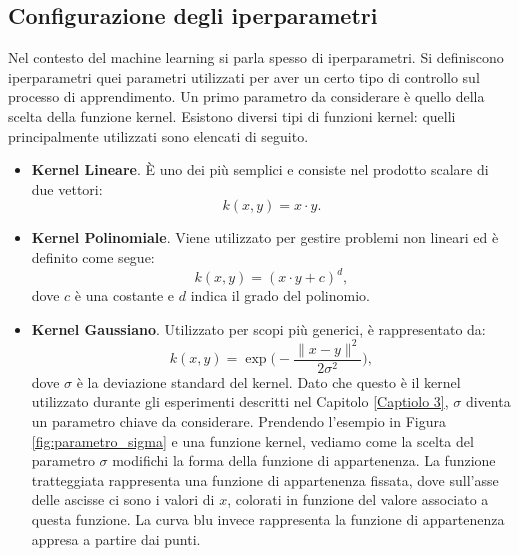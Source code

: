 \documentclass[a4paper,12pt]{report}
\begin{document}
\subsection*{Configurazione degli iperparametri}
Nel contesto del machine learning si parla spesso di iperparametri. Si definiscono iperparametri quei parametri utilizzati per aver un certo tipo di controllo sul processo di apprendimento. 
Un primo parametro da considerare è quello della scelta della funzione kernel.
Esistono diversi tipi di funzioni kernel: quelli principalmente utilizzati sono elencati di seguito.

\begin{itemize}
    \item \textbf{Kernel Lineare}. \`E uno dei più semplici e consiste nel prodotto scalare di due vettori:
    \begin{equation*}
        k(x,y) = x \cdot y.
    \end{equation*}

    \item  \textbf{Kernel Polinomiale}. Viene utilizzato per gestire problemi non lineari ed è definito come segue:
    \begin{equation*}
        k(x,y) = (x \cdot y + c)^{d},
    \end{equation*}
    \noindent dove $c$ è  una costante e $d$ indica il grado del polinomio.

    \item \textbf{Kernel Gaussiano}. Utilizzato per scopi più generici, è rappresentato da:
    \begin{equation*}
        k(x,y) = \exp{\bigg(-\frac{\|x-y\|^{2}}{2\sigma^{2}}\bigg)},
    \end{equation*}
    \noindent dove $\sigma$ è la deviazione standard del kernel. Dato che questo è il kernel utilizzato durante gli esperimenti descritti nel Capitolo \ref{Captiolo 3}, $\sigma$ diventa un parametro chiave da considerare. Prendendo l'esempio in Figura \ref{fig:parametro_sigma} e una funzione kernel, vediamo come la scelta del parametro $\sigma$ modifichi la forma della funzione di appartenenza. La funzione tratteggiata rappresenta una funzione di appartenenza fissata, dove sull'asse delle ascisse ci sono i valori di $x$, colorati in funzione del valore associato a questa funzione. La curva blu invece rappresenta la funzione di appartenenza appresa a partire dai punti.


\end{itemize}
\end{document}
